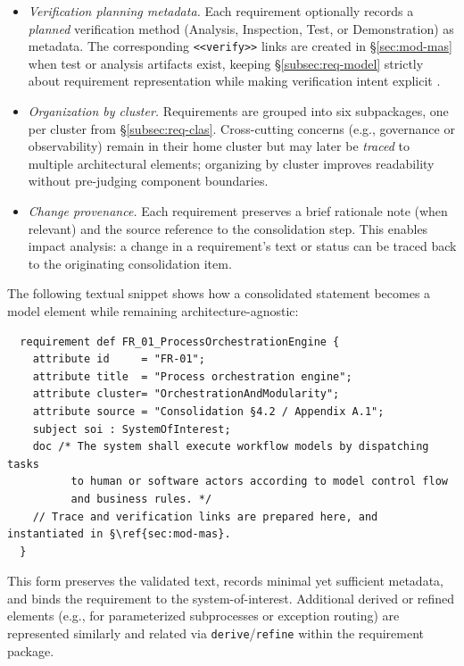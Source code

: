 \begin{itemize}
  \item \emph{Verification planning metadata.} Each requirement optionally records a \emph{planned} verification method (Analysis, Inspection, Test, or Demonstration) as metadata. The corresponding \texttt{<<verify>>} links are created in §\ref{sec:mod-mas} when test or analysis artifacts exist, keeping §\ref{subsec:req-model} strictly about requirement representation while making verification intent explicit \parencite{IEEEStandard1990}.
  \item \emph{Organization by cluster.} Requirements are grouped into six subpackages, one per cluster from §\ref{subsec:req-clas}. Cross-cutting concerns (e.g., governance or observability) remain in their home cluster but may later be \emph{traced} to multiple architectural elements; organizing by cluster improves readability without pre-judging component boundaries.
  \item \emph{Change provenance.} Each requirement preserves a brief rationale note (when relevant) and the source reference to the consolidation step. This enables impact analysis: a change in a requirement's text or status can be traced back to the originating consolidation item.
\end{itemize}

The following textual snippet shows how a consolidated statement becomes a model element while remaining architecture-agnostic:
\begin{footnotesize}
  \begin{verbatim}
  requirement def FR_01_ProcessOrchestrationEngine {
    attribute id     = "FR-01";
    attribute title  = "Process orchestration engine";
    attribute cluster= "OrchestrationAndModularity";
    attribute source = "Consolidation §4.2 / Appendix A.1";
    subject soi : SystemOfInterest;
    doc /* The system shall execute workflow models by dispatching tasks
          to human or software actors according to model control flow
          and business rules. */
    // Trace and verification links are prepared here, and instantiated in §\ref{sec:mod-mas}.
  }
  \end{verbatim}
\end{footnotesize}
This form preserves the validated text, records minimal yet sufficient metadata, and binds the requirement to the system-of-interest. Additional derived or refined elements (e.g., for parameterized subprocesses or exception routing) are represented similarly and related via \texttt{derive}/\texttt{refine} within the requirement package.

